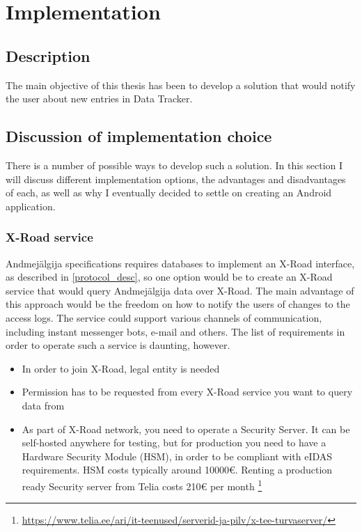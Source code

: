 \section{Implementation}

\subsection{Description}

The main objective of this thesis has been to develop a solution that would notify the user about new entries in Data Tracker.

\subsection{Discussion of implementation choice}
There is a number of possible ways to develop such a solution. In this section I will discuss different implementation options, the advantages and disadvantages of each, as well as why I eventually decided to settle on creating an Android application.

\subsubsection{X-Road service}
Andmejälgija specifications requires databases to implement an X-Road interface, as described in \ref{protocol_desc}, so one option would be to create an X-Road service that would query Andmejälgija data over X-Road. The main advantage of this approach would be the freedom on how to notify the users of changes to the access logs. The service could support various channels of communication, including instant messenger bots, e-mail and others. The list of requirements in order to operate such a service is daunting, however. 

\begin{itemize}
    \item {In order to join X-Road, legal entity is needed}
    \item {Permission has to be requested from every X-Road service you want to query data from}
    \item {As part of X-Road network, you need to operate a Security Server. It can be self-hosted anywhere for testing, but for production you need to have a Hardware Security Module (HSM), in order to be compliant with eIDAS requirements. HSM costs typically around 10000€. Renting a production ready Security server from Telia costs 210€ per month \footnote{\url{https://www.telia.ee/ari/it-teenused/serverid-ja-pilv/x-tee-turvaserver/}}}
\end{itemize}

